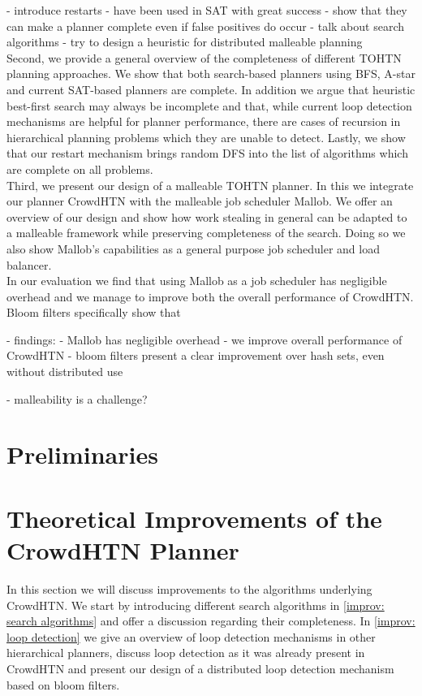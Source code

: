 \documentclass[enabledeprecatedfontcommands,12pt,a4paper,twoside]{scrartcl}
\numberwithin{equation}{section}
\begin{document}
- introduce restarts
	- have been used in SAT with great success 
	- show that they can make a planner complete even if false positives do occur
- talk about search algorithms
	- try to design a heuristic for distributed malleable planning\\
Second, we provide a general overview of the completeness of different TOHTN planning approaches. We show that both search-based planners using BFS, A-star and current SAT-based planners are complete. In addition we argue that heuristic best-first search may always be incomplete and that, while current loop detection mechanisms are helpful for planner performance, there are cases of recursion in hierarchical planning problems which they are unable to detect. Lastly, we show that our restart mechanism brings random DFS into the list of algorithms which are complete on all problems. \\
Third, we present our design of a malleable TOHTN planner. In this we integrate our planner CrowdHTN with the malleable job scheduler Mallob. We offer an overview of our design and show how work stealing in general can be adapted to a malleable framework while preserving completeness of the search. Doing so we also show Mallob's capabilities as a general purpose job scheduler and load balancer.\\
In our evaluation we find that using Mallob as a job scheduler has negligible overhead and we manage to improve both the overall performance of CrowdHTN. Bloom filters specifically show that 

- findings:
	- Mallob has negligible overhead
	- we improve overall performance of CrowdHTN
	- bloom filters present a clear improvement over hash sets, even without distributed use
	
	- malleability is a challenge?
\clearpage
\pagebreak
\section{Preliminaries}







\clearpage
\pagebreak
\section{Theoretical Improvements of the CrowdHTN Planner}
In this section we will discuss improvements to the algorithms underlying CrowdHTN. We start by introducing different search algorithms in \ref{improv: search algorithms} and offer a discussion regarding their completeness. In \ref{improv: loop detection} we give an overview of loop detection mechanisms in other hierarchical planners, discuss loop detection as it was already present in CrowdHTN and present our design of a distributed loop detection mechanism based on bloom filters.


\end{document}
